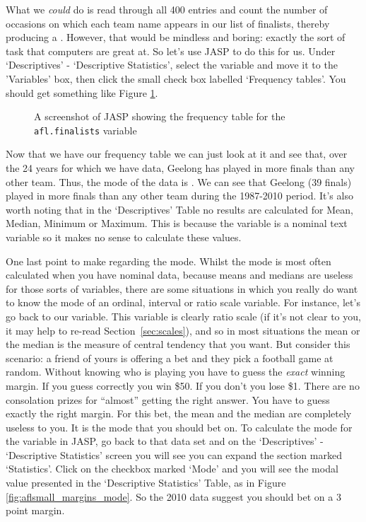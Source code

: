 What we {\it could} do is read through all 400 entries and count the number of occasions on which each team name appears in our list of finalists, thereby producing a . However, that would be mindless and boring: exactly the sort of task that computers are great at. So let's use JASP to do this for us. Under `Descriptives' - `Descriptive Statistics', select the  variable and move it to the 'Variables' box, then click the small check box labelled `Frequency tables'. You should get something like Figure \ref{fig:aflsmall_finalists_mode}. 

\begin{figure}[!!htp]
\begin{center}
\caption{A screenshot of JASP showing the frequency table for the \texttt{afl.finalists} variable }
\label{fig:aflsmall_finalists_mode}
\HR
\end{center}
\end{figure}

Now that we have our frequency table we can just look at it and see that, over the 24 years for which we have data, Geelong has played in more finals than any other team. Thus, the mode of the  data is . We can see that Geelong (39 finals) played in more finals than any other team during the 1987-2010 period. It's also worth noting that in the `Descriptives' Table no results are calculated for Mean, Median, Minimum or Maximum. This is because the  variable is a nominal text variable so it makes no sense to calculate these values.

One last point to make regarding the mode. Whilst the mode is most often calculated when you have nominal data, because means and medians are useless for those sorts of variables, there are some situations in which you really do want to know the mode of an ordinal, interval or ratio scale variable. For instance, let's go back to our  variable. This variable is clearly ratio scale (if it's not clear to you, it may help to re-read Section~\ref{sec:scales}), and so in most situations the mean or the median is the measure of central tendency that you want. But consider this scenario: a friend of yours is offering a bet and they pick a football game at random. Without knowing who is playing you have to guess the {\it exact} winning margin. If you guess correctly you win \$50. If you don't you lose \$1. There are no consolation prizes for ``almost'' getting the right answer. You have to guess exactly the right margin. For this bet, the mean and the median are completely useless to you. It is the mode that you should bet on. To calculate the mode for the  variable in JASP, go back to that data set and on the `Descriptives' - `Descriptive Statistics' screen you will see you can expand the section marked `Statistics'. Click on the checkbox marked `Mode' and you will see the modal value presented in the `Descriptive Statistics' Table, as in Figure \ref{fig:aflsmall_margins_mode}. So the 2010 data suggest you should bet on a 3 point margin.

